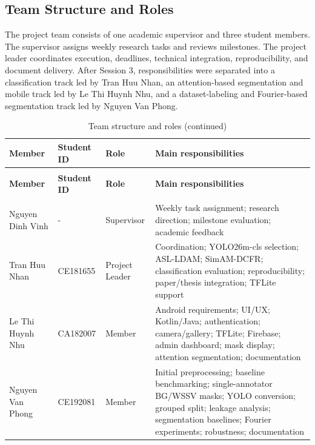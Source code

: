 \documentclass[12pt,a4paper]{report}
\begin{document}
\subsection{Team Structure and Roles}
The project team consists of one academic supervisor and three student members. The supervisor assigns weekly research tasks and reviews milestones. The project leader coordinates execution, deadlines, technical integration, reproducibility, and document delivery. After Session 3, responsibilities were separated into a classification track led by Tran Huu Nhan, an attention-based segmentation and mobile track led by Le Thi Huynh Nhu, and a dataset-labeling and Fourier-based segmentation track led by Nguyen Van Phong.\par
\begingroup
\footnotesize
\setlength{\tabcolsep}{2pt}
\renewcommand{\arraystretch}{1.16}
\begin{longtable}{|>{\centering\arraybackslash}p{3.00cm}|>{\centering\arraybackslash}p{2.20cm}|>{\centering\arraybackslash}p{2.70cm}|>{\centering\arraybackslash}p{7.60cm}|}
\caption{Team structure and roles}\\
\hline
\rowcolor{HeaderPeach}\textbf{Member} & \textbf{Student ID} & \textbf{Role} & \textbf{Main responsibilities} \\ \hline
\endfirsthead
\caption[]{Team structure and roles (continued)}\\
\hline
\rowcolor{HeaderPeach}\textbf{Member} & \textbf{Student ID} & \textbf{Role} & \textbf{Main responsibilities} \\ \hline
\endhead
\hline
\multicolumn{4}{r}{\footnotesize Continued on next page}\\
\endfoot
\hline
\endlastfoot
Nguyen Dinh Vinh & - & Supervisor & Weekly task assignment; research direction; milestone evaluation; academic feedback \\ \hline
Tran Huu Nhan & CE181655 & Project Leader & Coordination; YOLO26m-cls selection; ASL-LDAM; SimAM-DCFR; classification evaluation; reproducibility; paper/thesis integration; TFLite support \\ \hline
Le Thi Huynh Nhu & CA182007 & Member & Android requirements; UI/UX; Kotlin/Java; authentication; camera/gallery; TFLite; Firebase; admin dashboard; mask display; attention segmentation; documentation \\ \hline
Nguyen Van Phong & CE192081 & Member & Initial preprocessing; baseline benchmarking; single-annotator BG/WSSV masks; YOLO conversion; grouped split; leakage analysis; segmentation baselines; Fourier experiments; robustness; documentation \\ \hline
\end{longtable}
\end{document}
